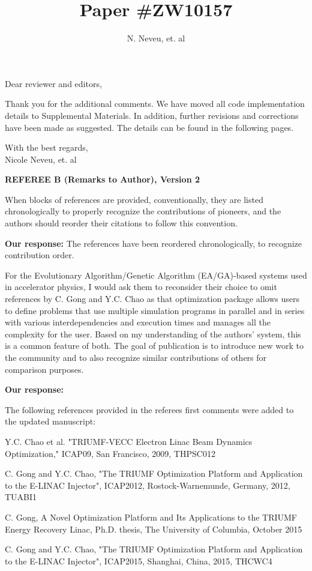 \documentclass{article}
\begin{document}
\title {Paper  \#ZW10157}
\author {N. Neveu, et. al}

\maketitle
Dear reviewer and editors,

Thank you for the additional comments.
We have moved all code implementation details to Supplemental Materials.
In addition, further revisions and corrections have been made as suggested.
The details can be found in the following pages.

With the best regards,  \\[3mm]
 
Nicole Neveu, et. al

\pagebreak

{\bf REFEREE B (Remarks to Author), Version 2}

When blocks of references are provided, conventionally, they are
listed chronologically to properly recognize the contributions of
pioneers, and the authors should reorder their citations to follow
this convention. 

{\bf Our response:} {\color{blue} The references have been 
	reordered chronologically, to recognize contribution order.}

For the Evolutionary Algorithm/Genetic Algorithm
(EA/GA)-based systems used in accelerator physics, I would ask them to
reconsider their choice to omit references by C. Gong and Y.C. Chao as
that optimization package allows users to define problems that use
multiple simulation programs in parallel and in series with various
interdependencies and execution times and manages all the complexity
for the user. Based on my understanding of the authors' system, this
is a common feature of both. The goal of publication is to introduce
new work to the community and to also recognize similar contributions
of others for comparison purposes.

{\bf Our response:} {\color{blue} The following references provided in the 
	referees first comments were added to the updated manuscript: 

Y.C. Chao et al. "TRIUMF-VECC Electron Linac Beam Dynamics
Optimization," ICAP09, San Francisco, 2009, THPSC012

C. Gong and Y.C. Chao, "The TRIUMF Optimization Platform and
Application to the E-LINAC Injector", ICAP2012, Rostock-Warnemunde,
Germany, 2012, TUABI1

C. Gong, A Novel Optimization Platform and Its Applications to the
TRIUMF Energy Recovery Linac, Ph.D. thesis, The University of
Columbia, October 2015

C. Gong and Y.C. Chao, "The TRIUMF Optimization Platform and
Application to the E-LINAC Injector", ICAP2015, Shanghai, China, 2015,
THCWC4}
\end{document}
